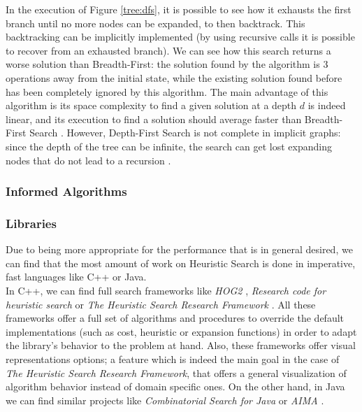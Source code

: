 In the execution of Figure \ref{tree:dfs}, it is possible to see how it
exhausts the first branch until no more nodes can be expanded, to then
backtrack. This backtracking can be implicitly implemented (by using recursive
calls it is possible to recover from an exhausted branch). We can see how this
search returns a worse solution than Breadth-First: the solution found by the
algorithm is 3 operations away from the initial state, while the existing
solution found before has been completely ignored by this algorithm. The main
advantage of this algorithm is its space complexity to find a given solution at
a depth $d$ is indeed linear, and its execution to find a solution should
average faster than Breadth-First Search \cite{zhang-1995-bnb}. However,
Depth-First Search is not complete in implicit graphs: since the depth of the
tree can be infinite, the search can get lost expanding nodes that do not lead
to a recursion \cite{russel-2003-aima}.\\

\subsubsection{Informed Algorithms}

\subsubsection{Libraries}

Due to being more appropriate for the performance that is in general desired,
we can find that the most amount of work on Heuristic Search is done in
imperative, fast languages like C++ or Java.\\

In C++, we can find full search frameworks like \emph{HOG2} \cite{hog2},
\emph{Research code for heuristic search} \cite{cpp-search} or \emph{The
  Heuristic Search Research Framework} \cite{goldenberg-2017-framework}. All
these frameworks offer a full set of algorithms and procedures to override the
default implementations (such as cost, heuristic or expansion functions) in
order to adapt the library's behavior to the problem at hand. Also, these
frameworks offer visual representations options; a feature which is indeed the
main goal in the case of \emph{The Heuristic Search Research Framework}, that
offers a general visualization of algorithm behavior instead of domain specific
ones. On the other hand, in Java we can find similar projects like
\emph{Combinatorial Search for Java} \cite{cs4j} or \emph{AIMA}
\cite{java-aima}.\\

